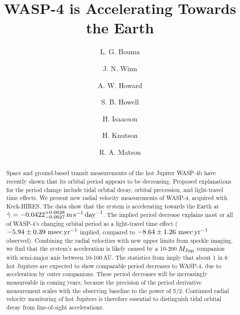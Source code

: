 \documentclass[12pt,twocolumn,tighten]{aastex62}
\begin{document}

\title{WASP-4 is Accelerating Towards the Earth}


%
%
\author[0000-0002-0514-5538]{L. G. Bouma}
%
\author[0000-0002-4265-047X]{J. N. Winn}

%
%
\author[0000-0001-8638-0320]{A. W. Howard}
%
\author{S. B. Howell}
%
\author[0000-0002-0531-1073]{H. Isaacson}
%
\author{H. Knutson}
%
\author{R. A. Matson}
%

\begin{abstract}
  Space and ground-based transit measurements of the hot Jupiter
  WASP-4b have recently shown that its orbital period appears to be
  decreasing.  Proposed explanations for the period change include
  tidal orbital decay, orbital precession, and light-travel time
  effects.  We present new radial velocity measurements of WASP-4,
  acquired with Keck-HIRES.  The data show that the system is
  accelerating towards the Earth at $\dot{\gamma} =
  -0.0422^{+0.0028}_{-0.0027}\,{\rm m}\,{\rm s}^{-1}\,{\rm day}^{-1}$.
  The implied period decrease explains most or all of WASP-4's
  changing orbital period as a light-travel time effect ($-5.94 \pm
  0.39~{\rm msec}\,{\rm yr}^{-1}$ implied, compared to $-8.64 \pm
  1.26~{\rm msec}\,{\rm yr}^{-1}$ observed).  Combining the radial
  velocities with new upper limits from speckle imaging, we find that
  the system's acceleration is likely caused by a 10-200$\,M_{\rm
  Jup}$ companion with semi-major axis between 10-100$\,$AU.  The
  statistics from \citet{knutson_friends_2014} imply that about 1 in 6
  hot Jupiters are expected to show comparable period decreases to
  WASP-4, due to acceleration by outer companions.  These
  period decreases will be increasingly measureable in coming years,
  because the precision of the period derivative measurement scales with
  the observing baseline to the power of 5/2.  Continued radial velocity monitoring
  of hot Jupiters is therefore essential to distinguish tidal orbital
  decay from line-of-sight accelerations.
\end{abstract}
\end{document}
